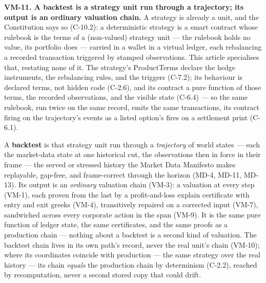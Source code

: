 \documentclass[11pt,a4paper]{article}
\newcommand{\vlabel}[1]{\leavevmode\hypertarget{vm-#1}{}%
  \marginpar{\raggedright\scriptsize\ttfamily\textcolor{gray}{#1}}}
\begin{document}
\vlabel{VM-11}\textbf{VM-11. A backtest is a strategy unit run through a
trajectory; its output is an ordinary valuation chain.} A strategy is already a
unit, and the Constitution says so (C-10.2): a deterministic strategy is a smart
contract whose rulebook is the terms of a (non-valued) strategy unit --- the
rulebook holds no value, its portfolio does --- carried in a wallet in a virtual
ledger, each rebalancing a recorded transaction triggered by stamped
observations. This article specialises that, restating none of it. The strategy's
ProductTerms declare the hedge instruments, the rebalancing rules, and the
triggers (C-7.2); its behaviour is declared terms, not hidden code (C-2.6), and
its contract a pure function of those terms, the recorded observations, and the
visible state (C-6.4) --- so the same rulebook, run twice on the same record,
emits the same transactions, its contract firing on the trajectory's events as a
listed option's fires on a settlement print (C-6.1).

A \textbf{backtest} is that strategy unit run through a \emph{trajectory} of world
states --- each the market-data state at one historical cut, the observations then
in force in their frame --- the served or stressed history the Market Data
Manifesto makes replayable, gap-free, and frame-correct through the horizon
(MD-4, MD-11, MD-13).
Its output is an \emph{ordinary} valuation chain (VM-3): a valuation at every step
(VM-1), each proven from the last by a profit-and-loss explain certificate with
entry and exit greeks (VM-4), transitively repaired on a corrected input (VM-7),
sandwiched across every corporate action in the span (VM-9). It is the same pure
function of ledger state, the same certificates, and the same proofs as a
production chain --- nothing about a backtest is a second kind of valuation. The
backtest chain lives in its own path's record, never the real unit's chain
(VM-10); where its coordinates coincide with production --- the same strategy over
the real history --- its chain \emph{equals} the production chain by determinism
(C-2.2), reached by recomputation, never a second stored copy that could drift.
\end{document}
